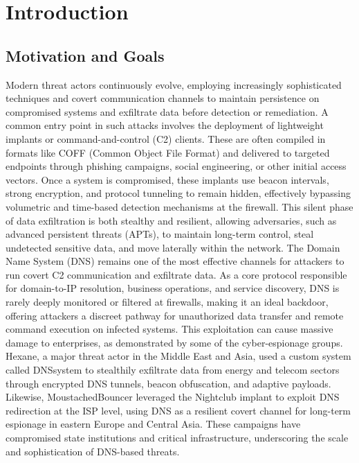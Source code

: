 \documentclass [11pt, proquest] {uwthesis}[2020/02/24]
\begin{document}
%
 
 
 
%
%

\textpages
 
 
\chapter {Introduction}
\section{Motivation and Goals}
Modern threat actors continuously evolve, employing increasingly sophisticated techniques and covert communication channels to maintain persistence on compromised systems and exfiltrate data before detection or remediation. A common entry point in such attacks involves the deployment of lightweight implants or command-and-control (C2) clients. These are often compiled in formats like COFF (Common Object File Format) and delivered to targeted endpoints through phishing campaigns, social engineering, or other initial access vectors.
Once a system is compromised, these implants use beacon intervals, strong encryption, and protocol tunneling to remain hidden, effectively bypassing volumetric and time-based detection mechanisms at the firewall. This silent phase of data exfiltration is both stealthy and resilient, allowing adversaries, such as advanced persistent threats (APTs), to maintain long-term control, steal undetected sensitive data, and move laterally within the network.
The Domain Name System (DNS) remains one of the most effective channels for attackers to run covert C2 communication and exfiltrate data. As a core protocol responsible for domain-to-IP resolution, business operations, and service discovery, DNS is rarely deeply monitored or filtered at firewalls, making it an ideal backdoor, offering attackers a discreet pathway for unauthorized data transfer and remote command execution on infected systems. 
This exploitation can cause massive damage to enterprises, as demonstrated by some of the cyber-espionage groups. Hexane, a major threat actor in the Middle East and Asia, used a custom system called DNSsystem to stealthily exfiltrate data from energy and telecom sectors through encrypted DNS tunnels, beacon obfuscation, and adaptive payloads. Likewise, MoustachedBouncer leveraged the Nightclub implant to exploit DNS redirection at the ISP level, using DNS as a resilient covert channel for long-term espionage in eastern Europe and Central Asia. These campaigns have compromised state institutions and critical infrastructure, underscoring the scale and sophistication of DNS-based threats.
\end{document}
